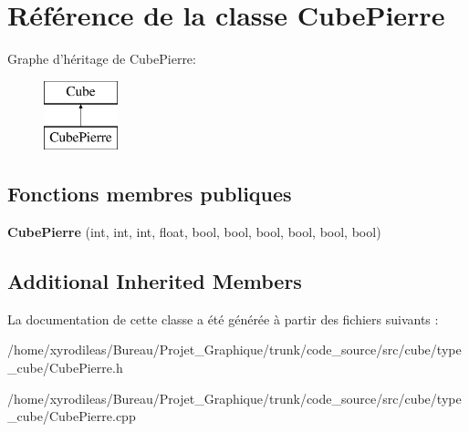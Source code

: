 \hypertarget{classCubePierre}{\section{Référence de la classe Cube\-Pierre}
\label{classCubePierre}
}
Graphe d'héritage de Cube\-Pierre\-:\begin{figure}[H]
\begin{center}
\leavevmode
\includegraphics[height=2.000000cm]{classCubePierre}
\end{center}
\end{figure}
\subsection*{Fonctions membres publiques}
\begin{DoxyCompactItemize}
\item 
\hypertarget{classCubePierre_a229ef3b4612798a0deba792041e528ba}{{\bfseries Cube\-Pierre} (int, int, int, float, bool, bool, bool, bool, bool, bool)}\label{classCubePierre_a229ef3b4612798a0deba792041e528ba}

\end{DoxyCompactItemize}
\subsection*{Additional Inherited Members}


La documentation de cette classe a été générée à partir des fichiers suivants \-:\begin{DoxyCompactItemize}
\item 
/home/xyrodileas/\-Bureau/\-Projet\-\_\-\-Graphique/trunk/code\-\_\-source/src/cube/type\-\_\-cube/Cube\-Pierre.\-h\item 
/home/xyrodileas/\-Bureau/\-Projet\-\_\-\-Graphique/trunk/code\-\_\-source/src/cube/type\-\_\-cube/Cube\-Pierre.\-cpp\end{DoxyCompactItemize}
